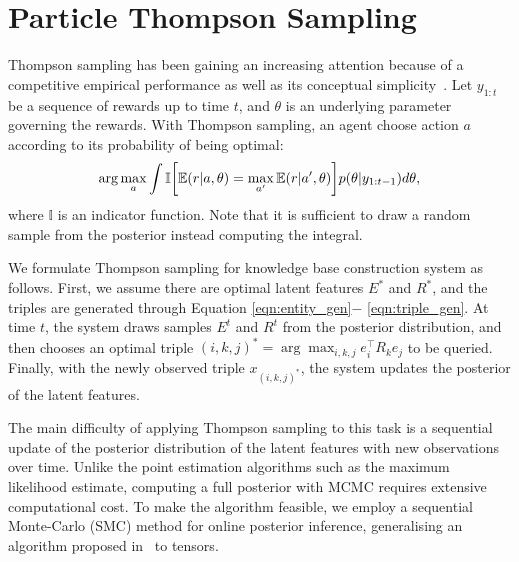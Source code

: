 \section{Particle Thompson Sampling}

Thompson sampling has been gaining an increasing attention
because of a competitive empirical performance as well as its conceptual
simplicity~\cite{scott10bandit,li11thompson}. Let $y_{1:t}$ be a sequence of rewards up to time $t$, and $\theta$ is an underlying parameter governing the rewards. With Thompson sampling, an agent choose action $a$ according to its probability of being optimal:
\begin{align}
\arg\max_a \int \mathbb{I}\bigg[ \mathbb{E}(r|a, \theta)
= \max_{a'}\mathbb{E}(r|a',\theta) \bigg] p(\theta|y_{1:t-1}) d\theta, \notag
\end{align}
where $\mathbb{I}$ is an indicator function. Note that it is sufficient
to draw a random sample from the posterior instead computing the integral.

We formulate Thompson sampling for knowledge base construction
system as follows.
First, we assume there are optimal latent features $E^*$ and $R^*$, and
the triples are generated through Equation \ref{eqn:entity_gen}$-$
\ref{eqn:triple_gen}. At time $t$, the system draws samples $E^t$ and $R^t$
from the posterior distribution, and then chooses an optimal triple $(i,k,j)^*
= \arg\max_{i,k,j} e_i^\top R_k e_j$ to be queried. Finally, with the newly
observed triple $x_{(i,k,j)^*}$, the system updates the posterior of the latent
features.

The main difficulty of applying Thompson sampling to this task is a sequential update of the posterior distribution of the latent features with new observations over time. Unlike the point estimation algorithms such as
the maximum likelihood estimate, computing a full posterior with MCMC
requires extensive computational cost. To make the algorithm feasible, we employ a sequential Monte-Carlo (SMC) method for online posterior inference, generalising an algorithm proposed
in~\cite{kawale2015efficient} to tensors.

